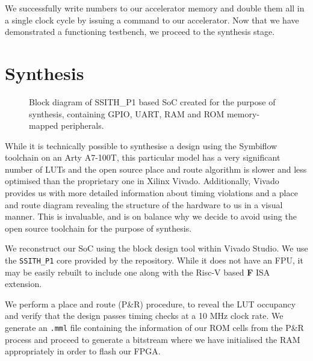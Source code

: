 \documentclass[a4paper,8pt]{report}
\begin{document}
We successfully write numbers to our accelerator memory and double them all in a
single clock cycle by issuing a command to our accelerator. Now that we have
demonstrated a functioning testbench, we proceed to the synthesis stage. 

\section{Synthesis}
\begin{figure}[b]
  \centering
  \caption{Block diagram of SSITH\_P1 based SoC created for the purpose of
    synthesis, containing GPIO, UART, RAM and ROM memory-mapped peripherals.}
\end{figure}

While it is technically possible to synthesise a design using the Symbiflow
toolchain on an Arty A7-100T, this particular model has a very significant
number of LUTs and the open source place and route algorithm is slower and less
optimised than the proprietary one in Xilinx Vivado. Additionally, Vivado
provides us with more detailed information about timing violations and a place
and route diagram revealing the structure of the hardware to us in a visual
manner. This is invaluable, and is on balance why we decide to avoid using the open
source toolchain for the purpose of synthesis.  

We reconstruct our SoC using the block design tool within Vivado Studio. We use
the \texttt{SSITH\_P1} core provided by the repository. While it does not have
an FPU, it may be easily rebuilt to include one along with the Risc-V based
\textbf{F} ISA extension.

We perform a place and route (P\&R) procedure, to reveal the LUT occupancy and verify
that the design passes timing checks at a 10 MHz clock rate. We generate an \texttt{.mml}
file containing the information of our ROM cells from the P\&R process and
proceed to generate a bitstream where we have initialised the RAM appropriately
in order to flash our FPGA.
\end{document}
